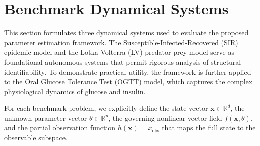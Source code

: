 \section{Benchmark Dynamical Systems}
\label{sec:benchmarks}



This section formulates three dynamical systems used to evaluate the proposed parameter estimation framework. 
The Susceptible-Infected-Recovered (SIR) epidemic model and the Lotka-Volterra (LV) predator-prey model serve as foundational autonomous systems that permit rigorous analysis of structural identifiability. 
To demonstrate practical utility, the framework is further applied to the Oral Glucose Tolerance Test (OGTT) model, which captures the complex physiological dynamics of glucose and insulin. 

For each benchmark problem, we explicitly define the state vector $\mathbf{x} \in \mathbb{R}^d$, the unknown parameter vector $\theta \in \mathbb{R}^p$, the governing nonlinear vector field $f(\mathbf{x}, \theta)$, and the partial observation function $h(\mathbf{x}) = x_\mathrm{obs}$ that maps the full state to the observable subspace.

